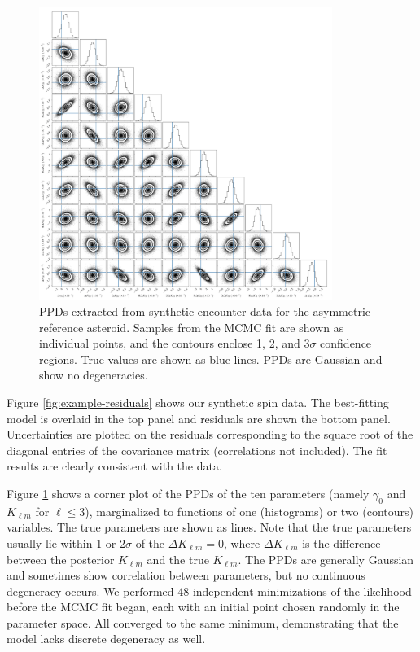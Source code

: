 \documentclass[fleqn,usenatbib]{mnras}
\begin{document}
\begin{figure}
  \centering
  \includegraphics[width=0.85\textwidth]{figs/example-corner.png}
  \caption{PPDs extracted from synthetic encounter data for the asymmetric reference asteroid. Samples from the MCMC fit are shown as individual points, and the contours enclose 1, 2, and 3$\sigma$ confidence regions. True values are shown as blue lines. PPDs are Gaussian and show no degeneracies.}
  \label{fig:example-corner}
\end{figure}

Figure \ref{fig:example-residuals} shows our synthetic spin data. The best-fitting model is overlaid in the top panel and residuals are shown the bottom panel. Uncertainties are plotted on the residuals corresponding to the square root of the diagonal entries of the covariance matrix (correlations not included). The fit results are clearly consistent with the data.

Figure \ref{fig:example-corner} shows a corner plot of the PPDs of the ten parameters (namely $\gamma_0$ and $K_{\ell m}$ for $\ell \leq 3$), marginalized to functions of one (histograms) or two (contours) variables. The true parameters are shown as lines. Note that the true parameters usually lie within 1 or 2$\sigma$ of the $\Delta K_{\ell m} = 0$, where $\Delta K_{\ell m}$ is the difference between the posterior $K_{\ell m}$ and the true $K_{\ell m}$. The PPDs are generally Gaussian and sometimes show correlation between parameters, but no continuous degeneracy occurs. We performed 48 independent minimizations of the likelihood before the MCMC fit began, each with an initial point chosen randomly in the parameter space. All converged to the same minimum, demonstrating that the model lacks discrete degeneracy as well.
\end{document}
